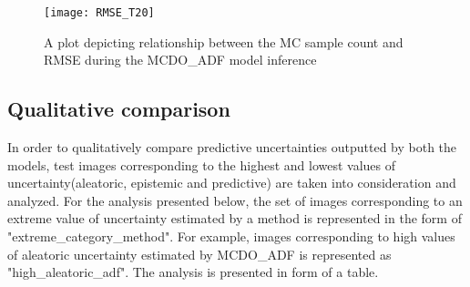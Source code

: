 \begin{figure}[h]
	\centering
	\texttt{[image: RMSE\_T20]}
	\caption{A plot depicting relationship between the MC sample count and RMSE during the MCDO\_ADF model inference}
	\label{fig_mc_count_vs_rmse}
\end{figure}
\subsection{Qualitative comparison}
In order to qualitatively compare predictive uncertainties outputted by both the models, test images corresponding to the highest and lowest values of uncertainty(aleatoric, epistemic and predictive) are taken into consideration and analyzed. For the analysis presented below, the set of images corresponding to an extreme value of uncertainty estimated by a method is represented in the form of "extreme\_category\_method". For example, images corresponding to high values of aleatoric uncertainty estimated by MCDO\_ADF is represented as "high\_aleatoric\_adf". The analysis is presented in form of a table.  

